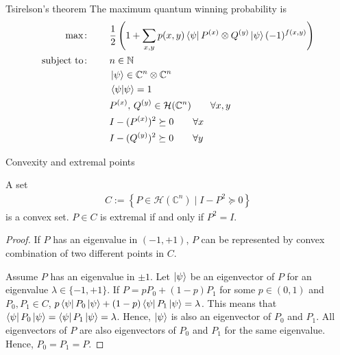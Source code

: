 \documentclass{beamer}
\newcommand\emm[1]{\textcolor{redorange}{{#1}}}
\begin{document}
\begin{frame}{Tsirelson's theorem}
\small
The maximum quantum winning probability is
\begin{align*}
\max\colon\qquad& \frac12\left(1 + \sum_{x,y}p(x,y) \bra{\psi}P^{(x)}\otimes Q^{(y)}\ket{\psi}(-1)^{f(x,y)}\right)\\
\text{subject to}\colon\qquad&
n\in\mathbb{N}\\
&\ket{\psi} \in \mathbb{C}^n\otimes\mathbb{C}^n\\
&\braket{\psi|\psi}=1\\
&P^{(x)},\, Q^{(y)} \in \mathcal{H}(\mathbb{C}^n)\qquad  \forall x,y\\
&I-(P^{(x)})^2\succeq 0\qquad \forall x\\
&I-(Q^{(y)})^2\succeq 0\qquad \forall y\\
\end{align*}
\end{frame}

\begin{frame}{Convexity and extremal points}
\begin{lemma}
A set
\begin{align*}
C:=\left\{P\in \mathcal{H}(\mathbb{C}^n)\mid I-P^2 \succeq 0\right\}
\end{align*}
is a convex set. $P\in C$ is \emm{extremal} if and only if \emm{$P^2=I$}.
\end{lemma}
\begin{proof}
If $P$ has an eigenvalue in $(-1,+1)$, $P$ can be represented by convex combination of two different points in $C$.

\vspace{1em}
Assume $P$ has an eigenvalue in $\pm1$. Let $\ket{\psi}$ be an eigenvector of $P$ for an eigenvalue $\lambda\in\{-1,+1\}$.
If $P=p P_0 + (1-p) P_1$ for some $p\in(0,1)$ and $P_0,P_1\in C$, $p\bra{\psi}P_0\ket{\psi}+(1-p)\bra{\psi}P_1\ket{\psi}=\lambda$.
This means that $\bra{\psi}P_0\ket{\psi}=\bra{\psi}P_1\ket{\psi}=\lambda$. Hence, $\ket{\psi}$ is also an eigenvector of $P_0$ and $P_1$.
All eigenvectors of $P$ are also eigenvectors of $P_0$ and $P_1$ for the same eigenvalue. Hence, $P_0=P_1=P$.
\end{proof}
\end{frame}
\end{document}
